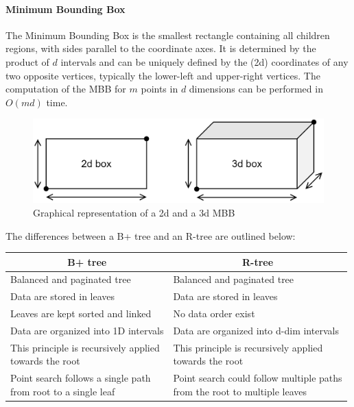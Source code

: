 \paragraph*{Minimum Bounding Box}
The Minimum Bounding Box is the smallest rectangle containing all children regions, with sides parallel to the coordinate axes.
It is determined by the product of $d$ intervals and can be uniquely defined by the (2d) coordinates of any two opposite vertices, typically the lower-left and upper-right vertices.
The computation of the MBB for $m$ points in $d$ dimensions can be performed in $O(md)$ time.
\begin{figure}[H]
    \centering
    \includegraphics[width=0.5\linewidth]{images/MBB.png}
    \caption{Graphical representation of a 2d and a 3d MBB}
\end{figure}
The differences between a B+ tree and an R-tree are outlined below: 
\begin{table}[H]
    \centering
    \begin{tabular}{ll}
    \hline
    \multicolumn{1}{c}{\textbf{B+ tree}}                                                & \multicolumn{1}{c}{\textbf{R-tree}}                                                               \\ \hline
    Balanced and paginated tree                                                         & Balanced and paginated tree                                                                       \\
    Data are stored in leaves                                                           & Data are stored in leaves                                                                         \\
    Leaves are kept sorted and linked                                                   & No data order exist                                                                               \\
    Data are organized into 1D intervals                                                & Data are organized into d-dim intervals                                                           \\
    \makecell[l]{This principle is recursively applied \\ towards the root}             & \makecell[l]{This principle is recursively applied \\ towards the root}                           \\
    \makecell[l]{Point search follows a single path \\ from root to a single leaf}      & \makecell[l]{Point search could follow multiple paths \\ from the root to multiple leaves}        \\ \hline
    \end{tabular}
\end{table}
